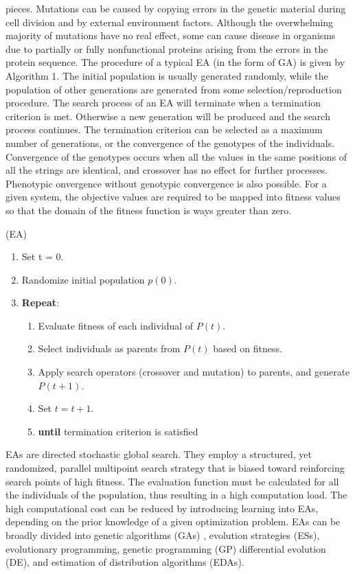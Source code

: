 \documentclass[14pt]{article}
\numberwithin{equation}{subsection}
\begin{document}
		pieces. Mutations can be caused by copying errors in the genetic material during cell division and by
		external environment factors. Although the overwhelming majority of mutations have no real effect, some can
		cause disease in organisms due to partially or fully nonfunctional proteins arising from the errors in the
		protein sequence. The procedure of a typical EA (in the form of GA) is given by Algorithm 1. The initial
		population is usually generated randomly, while the population of other generations are generated from some
		selection/reproduction procedure. The search process of an EA will terminate when a termination criterion is
		met. Otherwise a new generation will be produced and the search process continues. The termination criterion
		can be selected as a maximum number of generations, or the convergence of the genotypes of the individuals.
		Convergence of the genotypes occurs when all the values in the same positions of all the strings are
		identical, and crossover has no effect for further processes. Phenotypic   onvergence without genotypic
		convergence is also possible. For a given system, the objective values are required to be mapped into fitness
		values so that the domain of the fitness function is ways greater than zero.
    \begin{algorithm}
    \caption{(EA)} %
    \begin{enumerate}
        \item Set t = 0.
        \item Randomize initial population $p (0)$.
        \item \textbf{Repeat}:
            \begin{itemize}
                \begin{enumerate}
									\item Evaluate fitness of each individual of $P(t)$.
									\item Select individuals as parents from $P(t)$ based on fitness.
									\item Apply search operators (crossover and mutation) to parents, and generate $P(t + 1)$.
									\item Set $t = t + 1$.
									\item[] \textbf{until} termination criterion is satisfied
								\end{enumerate}
            \end{itemize}
    \end{enumerate}
    \end{algorithm}\par
		EAs are directed stochastic global search. They employ a structured, yet randomized, parallel multipoint
		search strategy that is biased toward reinforcing search
		points of high fitness. The evaluation function must be calculated for all the individuals of the population,
		thus resulting in a high computation load. The high computational cost can be reduced by introducing learning
		into EAs, depending on the prior
		knowledge of a given optimization problem.
		EAs can be broadly divided into genetic algorithms (GAs) , evolution
		strategies (ESs), evolutionary programming, genetic programming (GP)
		differential evolution (DE), and estimation of distribution algorithms
		(EDAs).
\end{document}
